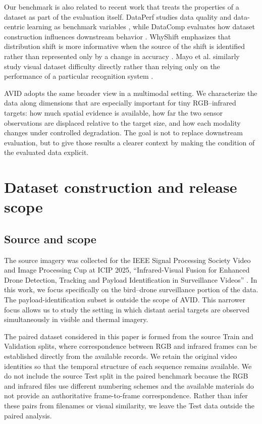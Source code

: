\documentclass[10pt]{article}
\newcommand{\dataset}{\textsc{AVID}}
\begin{document}
Our benchmark is also related to recent work that treats the properties of a dataset as part of the evaluation itself. DataPerf studies data quality and data-centric learning as benchmark variables \citep{mazumder2023dataperf}, while DataComp evaluates how dataset construction influences downstream behavior \citep{gadre2023datacomp}. WhyShift emphasizes that distribution shift is more informative when the source of the shift is identified rather than represented only by a change in accuracy \citep{liu2023whyshift}. Mayo et al. similarly study visual dataset difficulty directly rather than relying only on the performance of a particular recognition system \citep{mayo2023difficulty}.

\dataset{} adopts the same broader view in a multimodal setting. We characterize the data along dimensions that are especially important for tiny RGB--infrared targets: how much spatial evidence is available, how far the two sensor observations are displaced relative to the target size, and how each modality changes under controlled degradation. The goal is not to replace downstream evaluation, but to give those results a clearer context by making the condition of the evaluated data explicit.

\section{Dataset construction and release scope}
\label{sec:dataset}

\subsection{Source and scope}

The source imagery was collected for the IEEE Signal Processing Society Video and Image Processing Cup at ICIP 2025, ``Infrared-Visual Fusion for Enhanced Drone Detection, Tracking and Payload Identification in Surveillance Videos'' \citep{ieeevipcup2025}. In this work, we focus specifically on the bird--drone surveillance portion of the data. The payload-identification subset is outside the scope of \dataset{}. This narrower focus allows us to study the setting in which distant aerial targets are observed simultaneously in visible and thermal imagery.

The paired dataset considered in this paper is formed from the source Train and Validation splits, where correspondence between RGB and infrared frames can be established directly from the available records. We retain the original video identities so that the temporal structure of each sequence remains available. We do not include the source Test split in the paired benchmark because the RGB and infrared files use different numbering schemes and the available materials do not provide an authoritative frame-to-frame correspondence. Rather than infer these pairs from filenames or visual similarity, we leave the Test data outside the paired analysis.
\end{document}
